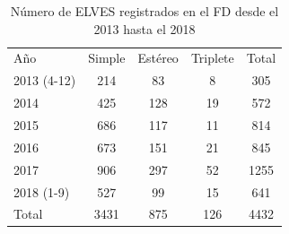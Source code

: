 \documentclass[11pt,oneside,openany,letter]{book}
\begin{document}
\begin{table}[]\centering
\caption{N\'umero de ELVES registrados en el FD desde el 2013 hasta el 2018 \cite{Mussa2019}}
\label{eventos_elves}
\begin{tabular}{lcccc}
\rowcolor[HTML]{EFEFEF} 
Año         & Simple & Estéreo & Triplete & Total                        \\
2013 (4-12) & 214    & 83      & 8        & \cellcolor[HTML]{EFEFEF}305  \\
2014        & 425    & 128     & 19       & \cellcolor[HTML]{EFEFEF}572  \\
2015        & 686    & 117     & 11       & \cellcolor[HTML]{EFEFEF}814  \\
2016        & 673    & 151     & 21       & \cellcolor[HTML]{EFEFEF}845  \\
2017        & 906    & 297     & 52       & \cellcolor[HTML]{EFEFEF}1255 \\
2018 (1-9)  & 527    & 99      & 15       & \cellcolor[HTML]{EFEFEF}641  \\
\rowcolor[HTML]{EFEFEF} 
Total       & 3431   & 875     & 126      & 4432                        
\end{tabular}
\end{table}

\end{document}
